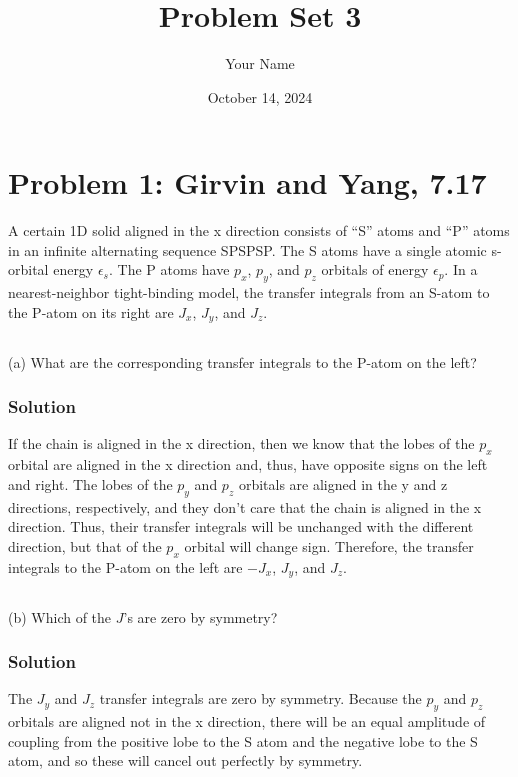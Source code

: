 \documentclass{article}
\begin{document}
\title{Problem Set 3}
\author{Your Name}
\date{October 14, 2024}
\maketitle

\section{Problem 1: Girvin and Yang, 7.17}

A certain 1D solid aligned in the x direction consists of “S” atoms and “P” atoms in an infinite alternating sequence SPSPSP. The S atoms have a single atomic s-orbital energy $\epsilon_s$. The P atoms have $p_x$, $p_y$, and $p_z$ orbitals of energy $\epsilon_p$. In a nearest-neighbor tight-binding model, the transfer integrals from an S-atom to the P-atom on its right are $J_x$, $J_y$, and $J_z$.\\
\subsection{}
(a) What are the corresponding transfer integrals to the P-atom on the left?\\
\subsubsection{Solution}
If the chain is aligned in the x direction, then we know that the lobes of the $p_x$ orbital are aligned in the x direction and, thus, have opposite signs on the left and right. The lobes of the $p_y$ and $p_z$ orbitals are aligned in the y and z directions, respectively, and they don't care that the chain is aligned in the x direction. Thus, their transfer integrals will be unchanged with the different direction, but that of the $p_x$ orbital will change sign. Therefore, the transfer integrals to the P-atom on the left are $-J_x$, $J_y$, and $J_z$.
\subsection{}
(b) Which of the $J$'s are zero by symmetry?\\
\subsubsection{Solution}
The $J_y$ and $J_z$ transfer integrals are zero by symmetry. Because the $p_y$ and $p_z$ orbitals are aligned not in the x direction, there will be an equal amplitude of coupling from the positive lobe to the S atom and the negative lobe to the S atom, and so these will cancel out perfectly by symmetry.
\end{document}
